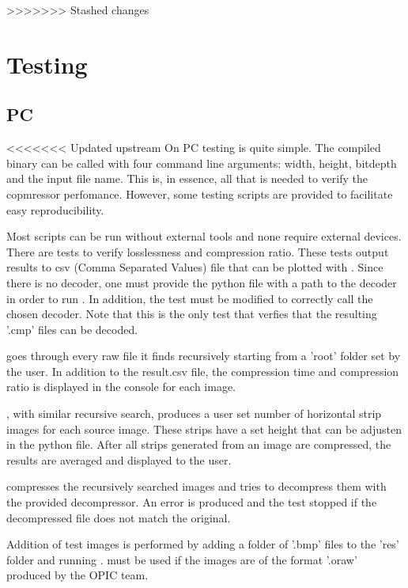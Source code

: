 \documentclass[12pt, a4paper]{article}
\begin{document}
\newpage
>>>>>>> Stashed changes
\section{Testing}
\subsection{PC}

<<<<<<< Updated upstream
On PC testing is quite simple. 
The compiled binary  can be called with four command line arguments: 
width, height, bitdepth and the input file name. 
This is, in essence, all that is needed to verify the copmressor perfomance. 
However, some testing scripts are provided to facilitate easy reproducibility. 

\medskip
\noindent
Most scripts can be run without external tools and none require external devices.
There are tests to verify losslessness and compression ratio. 
These tests output results to csv (Comma Separated Values) file that can be plotted with . 
Since there is no decoder, 
one must provide the python file with a path to the decoder in order to run . 
In addition, the test must be modified to correctly call the chosen decoder.
Note that this is the only test that verfies that the resulting '.cmp' files can be decoded. 

\medskip
\noindent
{} goes through every raw file it finds recursively starting from a 'root' folder set by the user.
In addition to the result.csv file, the compression time and compression ratio is displayed in the console for each image.

\medskip
\noindent
{}, with similar recursive search, produces a user set number of horizontal strip images for each source image. 
These strips have a set height that can be adjusten in the python file. 
After all strips generated from an image are compressed, the results are averaged and displayed to the user. 

\medskip
\noindent
{} compresses the recursively searched images and tries to decompress them with the provided decompressor.
An error is produced and the test stopped if the decompressed file does not match the original.

\medskip
\noindent
Addition of test images is performed by adding a folder of '.bmp' files to the 'res' folder and running . 
 must be used if the images are of the format '.oraw' produced by the OPIC team. 
\end{document}
